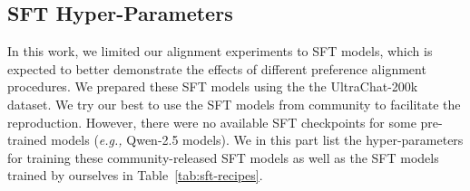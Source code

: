 \subsection{SFT Hyper-Parameters}
In this work, we limited our alignment experiments to SFT models, which is expected to better demonstrate the effects of different preference alignment procedures. We prepared these SFT models using the the UltraChat-200k dataset. We try our best to use the SFT models from community to facilitate the reproduction. However, there were no available SFT checkpoints for some pre-trained models (\textit{e.g.,} Qwen-2.5 models). We in this part list the hyper-parameters for training these community-released SFT models as well as the SFT models trained by ourselves in Table~\ref{tab:sft-recipes}.
\vspace{-0.2cm}
\begin{table}[h]
\centering
\caption{Training recipes for SFT models used in our experiments.}
\renewcommand{\arraystretch}{1.2} 
\label{tab:sft-recipes}
\end{table}


